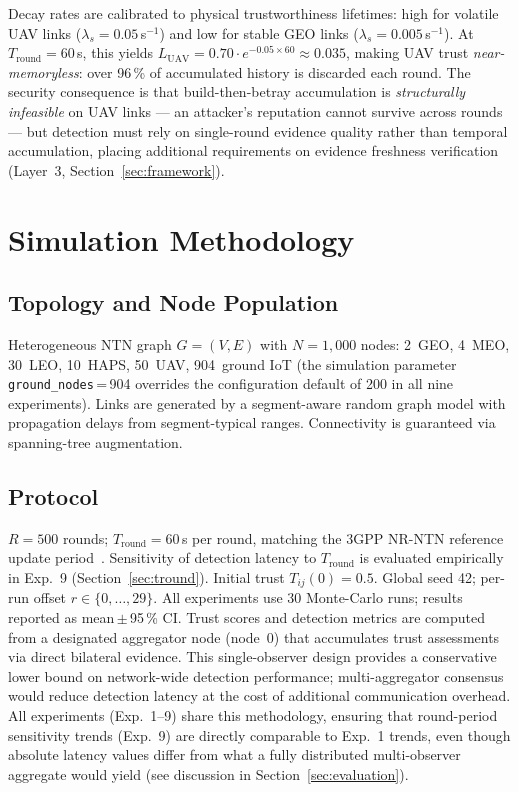 \documentclass[journal,twoside,10pt]{IEEEtran}
\begin{document}
Decay rates are calibrated to physical trustworthiness lifetimes:
high for volatile UAV links ($\lambda_s\!=\!0.05$\,s$^{-1}$) and
low for stable GEO links ($\lambda_s\!=\!0.005$\,s$^{-1}$).
At $T_{\mathrm{round}}\!=\!60$\,s, this yields
$L_{\mathrm{UAV}} = 0.70\!\cdot\!e^{-0.05\times60} \approx 0.035$,
making UAV trust \emph{near-memoryless}: over 96\,\% of accumulated
history is discarded each round.
The security consequence is that build-then-betray accumulation is
\emph{structurally infeasible} on UAV links --- an attacker's
reputation cannot survive across rounds --- but detection must rely on
single-round evidence quality rather than temporal accumulation,
placing additional requirements on evidence freshness verification
(Layer~3, Section~\ref{sec:framework}).

\section{Simulation Methodology}
\label{sec:simulation}

\subsection{Topology and Node Population}

Heterogeneous NTN graph $G\!=\!(V,E)$ with $N\!=\!1{,}000$ nodes:
2~GEO, 4~MEO, 30~LEO, 10~HAPS, 50~UAV, 904~ground IoT
(the simulation parameter \texttt{ground\_nodes}\,=\,904 overrides
the configuration default of 200 in all nine experiments).
Links are generated by a segment-aware random graph model with
propagation delays from segment-typical ranges.
Connectivity is guaranteed via spanning-tree augmentation.

\subsection{Protocol}

$R\!=\!500$ rounds; $T_{\mathrm{round}}\!=\!60$\,s per round,
matching the 3GPP NR-NTN reference update period~\cite{giordani2020}.
Sensitivity of detection latency to $T_{\mathrm{round}}$ is evaluated
empirically in Exp.~9 (Section~\ref{sec:tround}).
Initial trust $T_{ij}(0)\!=\!0.5$.
Global seed 42; per-run offset $r\!\in\!\{0,\ldots,29\}$.
All experiments use 30 Monte-Carlo runs; results reported as
mean\,$\pm$\,95\,\% CI.
Trust scores and detection metrics are computed from a designated
aggregator node (node~0) that accumulates trust assessments via
direct bilateral evidence.
This single-observer design provides a conservative lower bound on
network-wide detection performance; multi-aggregator consensus would
reduce detection latency at the cost of additional communication
overhead.
All experiments (Exp.~1--9) share this methodology, ensuring that
round-period sensitivity trends (Exp.~9) are directly comparable
to Exp.~1 trends, even though absolute latency values differ from
what a fully distributed multi-observer aggregate would yield
(see discussion in Section~\ref{sec:evaluation}).
\end{document}

